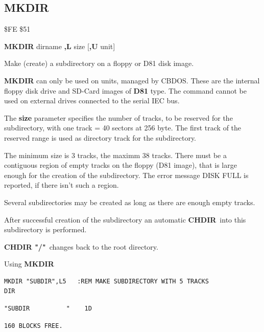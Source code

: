 \subsection{MKDIR}
\begin{description}[leftmargin=2cm,style=nextline]
\item [Token:] \$FE \$51
\item [Format:] {\bf MKDIR} dirname {\bf,L} size [{\bf,U} unit]
\item [Usage:] Make (create) a subdirectory on a floppy or D81 disk image.

   \filenamedefinition

   {\bf MKDIR} can only be used on units, managed by CBDOS.
   These are the internal floppy disk drive and SD-Card images of {\bf D81} type.
   The command cannot be used on external drives connected
   to the serial IEC bus.

   The {\bf size} parameter specifies the number of tracks, to be reserved
   for the subdirectory, with one track = 40 sectors at 256 byte.
   The first track of the reserved range is used as directory track
   for the subdirectory.

   The minimum size is 3 tracks, the maximm 38 tracks.
   There must be a contiguous region of empty tracks on the floppy
   (D81 image), that is large enough for the creation of the subdirectory.
   The error message DISK FULL is reported, if there isn't such a region.

   Several subdirectories may be created as long as there are enough
   empty tracks.

After successful creation of the subdirectory an automatic
{\bf CHDIR} into this subdirectory is performed.

{\bf CHDIR "/"} changes back to the root directory.

\item [Examples:] Using {\bf MKDIR}
\begin{tcolorbox}[colback=black,coltext=white]
\verbatimfont{\codefont}
\begin{verbatim}
MKDIR "SUBDIR",L5   :REM MAKE SUBDIRECTORY WITH 5 TRACKS
DIR
\end{verbatim}
\selectfont{\codefont 0}
\begin{tcolorbox}[colback=white,coltext=black,arc=0mm,boxrule=0mm,
       left*=0.5mm,right*=0mm,top=0mm,bottom=0mm,nobeforeafter,
       left skip=0.5mm,
       width=28mm,height=3mm,valign=center]
\begin{verbatim}
"SUBDIR          "    1D
\end{verbatim}
\end{tcolorbox}
\begin{verbatim}
160 BLOCKS FREE.

\end{verbatim}
\end{tcolorbox}
\end{description}

